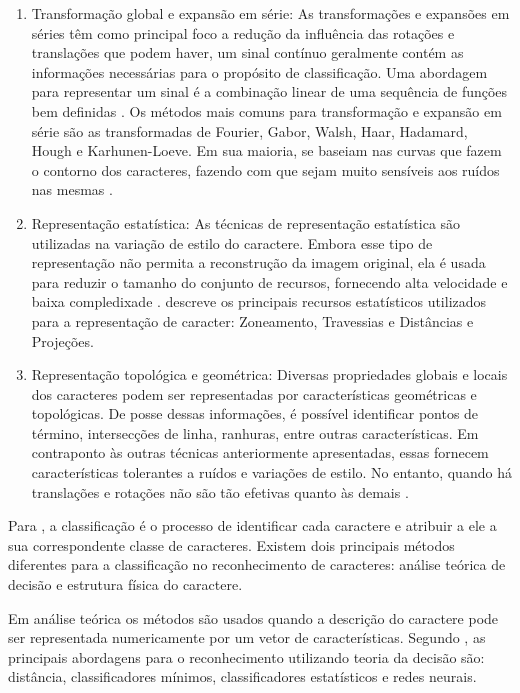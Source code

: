\begin{enumerate}
	\item Transformação global e expansão em série: As transformações e expansões em séries têm como principal foco a
redução da influência das rotações e translações que podem haver, um sinal contínuo geralmente contém as informações necessárias para o propósito de classificação. Uma abordagem para representar um sinal é a combinação linear de uma sequência de funções bem definidas \cite{Goswami2013}. Os métodos mais comuns para transformação e expansão em série são as transformadas de Fourier, Gabor, Walsh, Haar, Hadamard, Hough e Karhunen-Loeve. Em sua maioria, se baseiam nas curvas que fazem o contorno dos caracteres, fazendo com que sejam muito sensíveis aos ruídos nas mesmas \cite{Eikvil1993}.
	\item Representação estatística: As técnicas de representação estatística são utilizadas na variação de estilo do caractere. Embora esse tipo de representação não permita a reconstrução da imagem original, ela é usada para reduzir o tamanho do conjunto de recursos, fornecendo alta velocidade e baixa compledixade \cite{Eikvil1993}.  descreve os principais recursos estatísticos utilizados para a representação de caracter: Zoneamento, Travessias e Distâncias e Projeções.
	
	\item Representação topológica e geométrica: Diversas propriedades globais e locais dos caracteres podem ser representadas por características geométricas e topológicas. De posse dessas informações, é possível identificar pontos de término, intersecções de linha, ranhuras, entre outras características. Em contraponto às outras técnicas anteriormente apresentadas, essas fornecem características tolerantes a ruídos e variações de estilo. No entanto, quando há translações e rotações não são tão efetivas quanto às demais \cite{ANDRADE2016}. 
\end{enumerate}



Para , a classificação é o processo de identificar cada caractere e atribuir a ele a sua correspondente classe de caracteres. Existem dois principais métodos diferentes para a classificação no reconhecimento de caracteres: análise teórica de decisão e estrutura física do caractere. 


Em análise teórica os métodos são usados quando a descrição do caractere pode ser representada numericamente por um vetor de características. Segundo , as principais abordagens para o reconhecimento utilizando teoria da decisão são: distância, classificadores mínimos, classificadores estatísticos e redes neurais.

